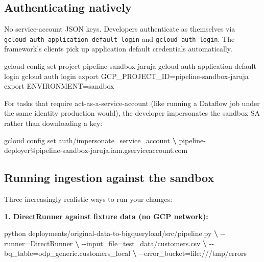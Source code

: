 \documentclass[
  11pt,
  british,
  oneside]{book}
\newenvironment{Shaded}{\begin{snugshade}}{\end{snugshade}}
\newcommand{\BuiltInTok}[1]{#1}
\newcommand{\ExtensionTok}[1]{#1}
\newcommand{\KeywordTok}[1]{\textcolor[rgb]{0.13,0.29,0.53}{\textbf{#1}}}
\newcommand{\NormalTok}[1]{#1}
\newcommand{\VariableTok}[1]{\textcolor[rgb]{0.00,0.00,0.00}{#1}}
\begin{document}
\hypertarget{authenticating-natively}{%
\subsection{Authenticating natively}\label{authenticating-natively}}

No service-account JSON keys. Developers authenticate as themselves via
\texttt{gcloud\ auth\ application-default\ login} and
\texttt{gcloud\ auth\ login}. The framework's clients pick up
application default credentials automatically.

\begin{Shaded}
\begin{Highlighting}[]
\ExtensionTok{gcloud}\NormalTok{ config set project pipeline{-}sandbox{-}jaruja}
\ExtensionTok{gcloud}\NormalTok{ auth application{-}default login}
\ExtensionTok{gcloud}\NormalTok{ auth login}
\BuiltInTok{export} \VariableTok{GCP\_PROJECT\_ID=}\NormalTok{pipeline{-}sandbox{-}jaruja}
\BuiltInTok{export} \VariableTok{ENVIRONMENT=}\NormalTok{sandbox}
\end{Highlighting}
\end{Shaded}

For tasks that require act-as-a-service-account (like running a Dataflow
job under the same identity production would), the developer
impersonates the sandbox SA rather than downloading a key:

\begin{Shaded}
\begin{Highlighting}[]
\ExtensionTok{gcloud}\NormalTok{ config set auth/impersonate\_service\_account }\KeywordTok{\textbackslash{}}
  \ExtensionTok{pipeline{-}deployer@pipeline{-}sandbox{-}jaruja.iam.gserviceaccount.com}
\end{Highlighting}
\end{Shaded}

\hypertarget{running-ingestion-against-the-sandbox}{%
\subsection{Running ingestion against the
sandbox}\label{running-ingestion-against-the-sandbox}}

Three increasingly realistic ways to run your changes:

\textbf{1. DirectRunner against fixture data (no GCP network):}

\begin{Shaded}
\begin{Highlighting}[]
\ExtensionTok{python}\NormalTok{ deployments/original{-}data{-}to{-}bigqueryload/src/pipeline.py }\KeywordTok{\textbackslash{}}
  \ExtensionTok{{-}{-}runner}\NormalTok{=DirectRunner }\KeywordTok{\textbackslash{}}
  \ExtensionTok{{-}{-}input\_file}\NormalTok{=test\_data/customers.csv }\KeywordTok{\textbackslash{}}
  \ExtensionTok{{-}{-}bq\_table}\NormalTok{=odp\_generic.customers\_local }\KeywordTok{\textbackslash{}}
  \ExtensionTok{{-}{-}error\_bucket}\NormalTok{=file:///tmp/errors}
\end{Highlighting}
\end{Shaded}
\end{document}
